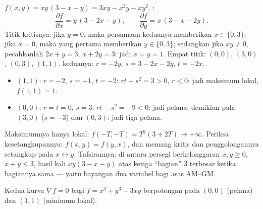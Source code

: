\begin{example}
\label{ex:b1:multivar:fourpoints}
$f(x, y) = xy\,(3 - x - y) = 3xy - x^2y - xy^2$. :
\[
\frac{\partial f}{\partial x} = y\,(3 - 2x - y),
\qquad
\frac{\partial f}{\partial y} = x\,(3 - x - 2y).
\]
Titik kritisnya: jika $y = 0$, maka persamaan keduanya memberikan $x \in
\{0, 3\}$; jika $x = 0$, maka yang pertama memberikan $y \in \{0, 3\}$; sedangkan jika $xy
\neq 0$, pecahkanlah $2x + y = 3$, $x + 2y = 3$: jadi $x = y = 1$. Empat
titik: $(0,0)$, $(3,0)$, $(0,3)$, $(1,1)$.  keduanya:
$r = -2y$, $s = 3 - 2x - 2y$, $t = -2x$.
\begin{itemize}
  \item $(1,1)$: $r = -2$, $s = -1$, $t = -2$: $rt - s^2 = 3 >
        0$, $r < 0$: jadi maksimum lokal, $f(1,1) = 1$.
  \item $(0,0)$: $r = t = 0$, $s = 3$: $rt - s^2 = -9 < 0$:
        jadi pelana; demikian pula $(3, 0)$ ($s = -3$) dan $(0, 3)$: jadi tiga
        pelana.
\end{itemize}
Maksimumnya hanya lokal: $f(-T, -T) = T^2(3 + 2T) \to
+\infty$. Periksa kesetangkupannya: $f(x, y) = f(y, x)$, dan memang
 kritis dan penggolongannya setangkup pada $x
\leftrightarrow y$. Tafsirannya: di antara persegi  berkelonggaran
$x, y \geq 0$, $x + y \leq 3$, hasil kali $xy(3 - x - y)$ atas
ketiga ``bagian'' $3$ terbesar ketika bagiannya sama
--- yaitu bayangan dua variabel bagi asas AM--GM.
\end{example}

\begin{omfigure}

{\small Kedua kurva $\nabla f = 0$ bagi $f = x^3 + y^3 - 3xy$
berpotongan pada  $(0,0)$ (pelana) dan $(1,1)$
(minimum lokal).}
\end{omfigure}

